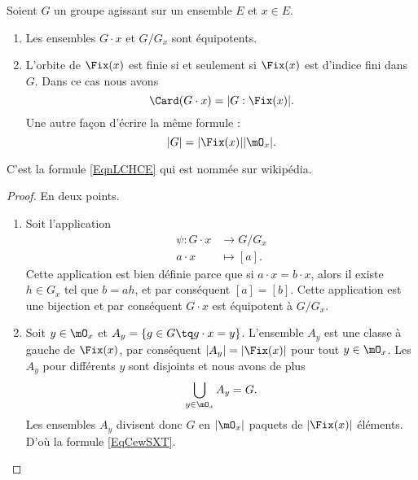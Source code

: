 \begin{proposition}      \label{Propszymlr}
	Soient \( G\) un groupe agissant sur un ensemble \( E\) et \( x\in E\).
	\begin{enumerate}
		\item
		      Les ensembles \( G \cdot x\) et \( G/G_x\) sont équipotents.
		\item       \label{ITEMooCWUGooCOFHYk}
		      L'orbite de \(\Fix(x)\) est finie si et seulement si \( \Fix(x)\) est d'indice fini dans \( G\). Dans ce cas nous avons
		      \begin{equation}        \label{EqnLCHCE}
			      \Card(G\cdot x)=| G:\Fix(x) |.
		      \end{equation}
		      Une autre façon d'écrire la même formule :
		      \begin{equation}        \label{EqCewSXT}
			      | G |=| \Fix(x) | |\mO_x |.
		      \end{equation}
	\end{enumerate}
\end{proposition}
C'est la formule \eqref{EqnLCHCE} qui est nommée  sur wikipédia.

\begin{proof}
	En deux points.
	\begin{enumerate}
		\item
		      Soit l'application
		      \begin{equation}
			      \begin{aligned}
				      \psi\colon G\cdot x & \to G/G_x    \\
				      a\cdot x            & \mapsto [a].
			      \end{aligned}
		      \end{equation}
		      Cette application est bien définie parce que si \( a\cdot x=b\cdot x\), alors il existe \( h\in G_x\) tel que \( b=ah\), et par conséquent \( [a]=[b]\). Cette application est une bijection et par conséquent \( G\cdot x\) est équipotent à \( G/G_x\).
		\item
		      Soit \( y\in \mO_x\) et \( A_y=\{ g\in G\tq g\cdot x=y \}\). L'ensemble \( A_y\) est une classe à gauche de \( \Fix(x)\), par conséquent \( | A_y |=|\Fix(x)|\) pour tout \( y\in\mO_x\). Les \( A_y\) pour différents \( y\) sont disjoints et nous avons de plus
		      \begin{equation}
			      \bigcup_{y\in\mO_x}A_y=G.
		      \end{equation}
		      Les ensembles \( A_y\) divisent donc \( G\) en \( | \mO_x |\) paquets de \( | \Fix(x) |\) éléments. D'où la formule \eqref{EqCewSXT}.
	\end{enumerate}
\end{proof}

